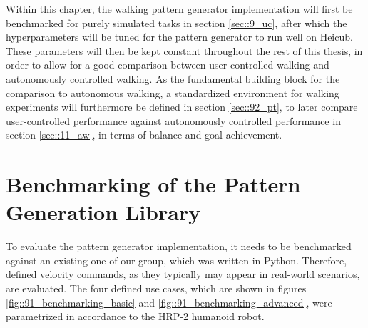 
\label{sec::9_uc}
Within this chapter, the walking pattern generator implementation will first be benchmarked for purely simulated tasks in section \ref{sec::9_uc}, after which the hyperparameters will be tuned for the pattern generator to run well on Heicub. These parameters will then be kept constant throughout the rest of this thesis, in order to allow for a good comparison between user-controlled walking and autonomously controlled walking. As the fundamental building block for the comparison to autonomous walking, a standardized environment for walking experiments will furthermore be defined in section \ref{sec::92_pt}, to later compare user-controlled performance against autonomously controlled performance in section \ref{sec::11_aw}, in terms of balance and goal achievement.
\FloatBarrier
\section{Benchmarking of the Pattern Generation Library}
\label{sec::91_bm}
To evaluate the pattern generator implementation, it needs to be benchmarked against an existing one of our group, which was written in Python. Therefore, defined velocity commands, as they typically may appear in real-world scenarios, are evaluated. The four defined use cases, which are shown in figures \ref{fig::91_benchmarking_basic} and \ref{fig::91_benchmarking_advanced}, were parametrized in accordance to the HRP-2 humanoid robot.
